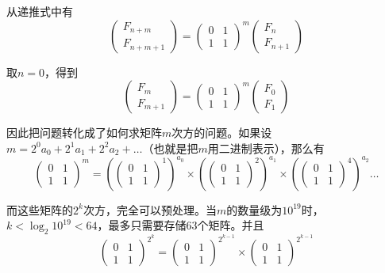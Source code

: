 \documentclass[UTF8,12pt]{ctexart}
\begin{document}
从递推式中有
\[\begin{pmatrix}F_{n+m}\\F_{n+m+1}\end{pmatrix}=\begin{pmatrix}0&1\\1&1\end{pmatrix}^m\begin{pmatrix}F_{n}\\F_{n+1}\end{pmatrix}\]

取$n=0$，得到
\[\begin{pmatrix}F_{m}\\F_{m+1}\end{pmatrix}=\begin{pmatrix}0&1\\1&1\end{pmatrix}^m\begin{pmatrix}F_{0}\\F_{1}\end{pmatrix}\]

因此把问题转化成了如何求矩阵$m$次方的问题。如果设$m=2^0a_0+2^1a_1+2^2a_2+\dots$（也就是把$m$用二进制表示），那么有
\[\begin{pmatrix}0&1\\1&1\end{pmatrix}^m=\left(\begin{pmatrix}0&1\\1&1\end{pmatrix}^{1}\right)^{a_0}\times \left(\begin{pmatrix}0&1\\1&1\end{pmatrix}^{2}\right)^{a_1}\times \left(\begin{pmatrix}0&1\\1&1\end{pmatrix}^{4}\right)^{a_2}\dots\]

而这些矩阵的$2^k$次方，完全可以预处理。当$m$的数量级为$10^{19}$时，$k<\log_2 10^{19}<64$，最多只需要存储63个矩阵。并且
\[\begin{pmatrix}0&1\\1&1\end{pmatrix}^{2^k}=\begin{pmatrix}0&1\\1&1\end{pmatrix}^{2^{k-1}}\times \begin{pmatrix}0&1\\1&1\end{pmatrix}^{2^{k-1}}\]
\end{document}
